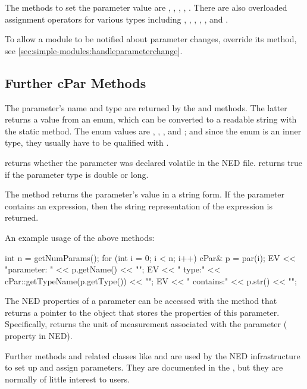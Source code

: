 The methods to set the parameter value are ,
, ,
, . There are also
overloaded assignment operators for various types including ,
, , , , and
.

To allow a module to be notified about parameter changes, override
its  method, see
\ref{sec:simple-modules:handleparameterchange}.


\subsection{Further cPar Methods}
\label{sec:simple-modules:further-cpar-methods}

The parameter's name and type are returned by the  and
 methods. The latter returns a value from an enum,
which can be converted to a readable string with the 
static method. The enum values are , , ,
 and ; and since the enum is an inner type,
they usually have to be qualified with .

 returns whether the parameter was declared volatile
in the NED file.  returns true if the parameter
type is double or long.

The  method returns the parameter's value in a string form.
If the parameter contains an expression, then the string representation
of the expression is returned.

An example usage of the above methods:

\begin{cpp}
int n = getNumParams();
for (int i = 0; i < n; i++)
{
    cPar& p = par(i);
    EV << "parameter: " << p.getName() << "\n";
    EV << "  type:" << cPar::getTypeName(p.getType()) << "\n";
    EV << "  contains:" << p.str() << "\n";
}
\end{cpp}

The NED properties of a parameter can be accessed with the 
method that returns a pointer to the  object that stores
the properties of this parameter. Specifically,  returns
the unit of measurement associated with the parameter ( property in NED).

Further  methods and related classes like  and
 are used by the NED infrastructure to set up and
assign parameters. They are documented in the , but
they are normally of little interest to users.


